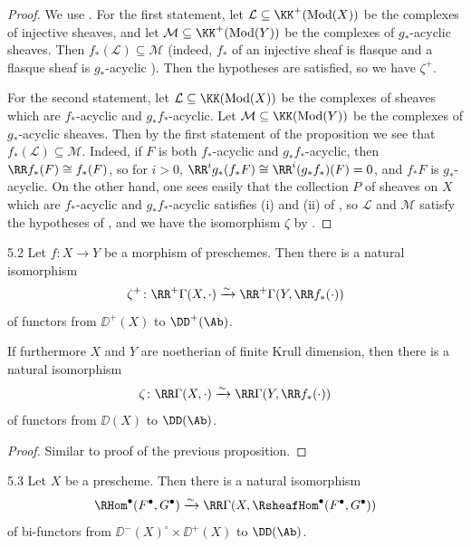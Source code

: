 \begin{proof}
We use . For the first statement, let $\mathcal{L}\subseteq\KK^+(\operatorname{Mod}(X))$ be the complexes of injective sheaves, and let $\mathcal{M}\subseteq\KK^+(\operatorname{Mod}(Y))$ be the complexes of $g_*$-acyclic sheaves. Then $f_*(\mathcal{L})\subseteq\mathcal{M}$ (indeed, $f_*$ of an injective sheaf is flasque \cite[\nopp $0_{\mathrm{III}}$, 12.2.4]{EGA} and a flasque sheaf is $g_*$-acyclic \cite[\nopp $0_{\mathrm{III}}$, 12.2.1]{EGA}). Then the hypotheses are satisfied, so we have $\zeta^+$.

For the second statement, let $\mathcal{L}\subseteq\KK(\operatorname{Mod}(X))$ be the complexes of sheaves which are $f_*$-acyclic and $g_*f_*$-acyclic. Let $\mathcal{M}\subseteq\KK(\operatorname{Mod}(Y))$ be the complexes of $g_*$-acyclic sheaves. Then by the first statement of the proposition we see that $f_*(\mathcal{L})\subseteq\mathcal{M}$. Indeed, if $F$ is both $f_*$-acyclic and $g_*f_*$-acyclic, then $\RR f_*(F)\cong f_*(F)$, so for $i>0$, $\RR^ig_*(f_*F)\cong\RR^i(g_*f_*)(F)=0$, and $f_*F$ is $g_*$-acyclic. On the other hand, one sees easily that the collection $P$ of sheaves on $X$ which are $f_*$-acyclic and $g_*f_*$-acyclic satisfies (i) and (ii) of , so $\mathcal{L}$ and $\mathcal{M}$ satisfy the hypotheses of , and we have the isomorphism $\zeta$ by .
\end{proof}

\begin{bookproposition}{5.2}\label{prop:2.5.2}
Let $f\colon X\to Y$ be a morphism of preschemes. Then there is a natural isomorphism
\[
\zeta^+\colon \RR^+\Gamma(X,\cdot) \xrightarrow{\sim} \RR^+\Gamma(Y,\RR f_*(\cdot))
\]
of functors from $\DD^+(X)$ to $\DD^+(\Ab)$.

If furthermore $X$ and $Y$ are noetherian of finite Krull dimension, then there is a natural isomorphism
\[
\zeta\colon \RR\Gamma(X,\cdot) \xrightarrow{\sim} \RR\Gamma(Y,\RR f_*(\cdot))
\]
of functors from $\DD(X)$ to $\DD(\Ab)$.
\end{bookproposition}

\begin{proof}
Similar to proof of the previous proposition.
\end{proof}

\begin{bookproposition}{5.3}\label{prop:2.5.3}
Let $X$ be a prescheme. Then there is a natural isomorphism
\[
\RHom^\bullet(F^\bullet,G^\bullet) \xrightarrow{\sim} \RR\Gamma(X,\RsheafHom^\bullet(F^\bullet,G^\bullet))
\]
of bi-functors from $\DD^-(X)^\circ\times\DD^+(X)$ to $\DD(\Ab)$.
\end{bookproposition}

